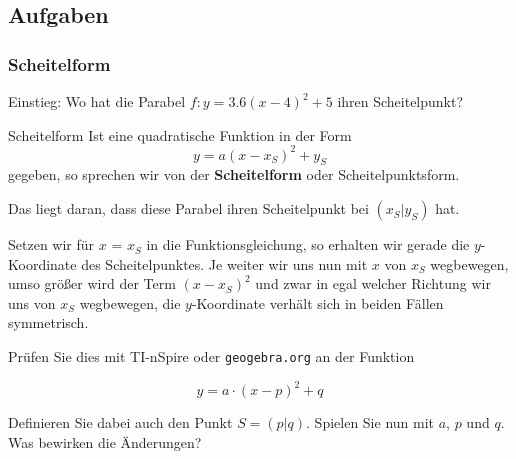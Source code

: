

\subsection*{Aufgaben}%
\newpage

\subsubsection{Scheitelform}
Einstieg: Wo hat die Parabel $f: y=3.6(x-4)^2 + 5$ ihren
Scheitelpunkt?


\begin{gesetz}{Scheitelform}{}
  Ist eine quadratische Funktion in der Form
$$y = a(x-x_S)^2 + y_S$$
gegeben, so sprechen wir von der \textbf{Scheitelform} oder Scheitelpunktsform.
\end{gesetz}

Das liegt daran, dass diese Parabel ihren Scheitelpunkt bei
$(x_S|y_S)$ hat.

Setzen wir für $x$ = $x_S$ in die Funktionsgleichung, so erhalten wir
gerade die $y$-Koordinate des Scheitelpunktes. Je weiter wir uns nun
mit $x$ von $x_S$ wegbewegen, umso größer wird der Term $(x-x_S)^2$
und zwar in egal welcher Richtung wir uns von $x_S$ wegbewegen, die
$y$-Koordinate verhält sich in beiden Fällen symmetrisch.

Prüfen Sie dies mit TI-nSpire oder \texttt{geogebra.org} an der Funktion

$$y = a\cdot{}(x-p)^2 + q$$

Definieren Sie dabei auch den Punkt $S=(p|q)$. Spielen Sie nun mit
$a$, $p$ und $q$. Was bewirken die Änderungen?
\newpage


